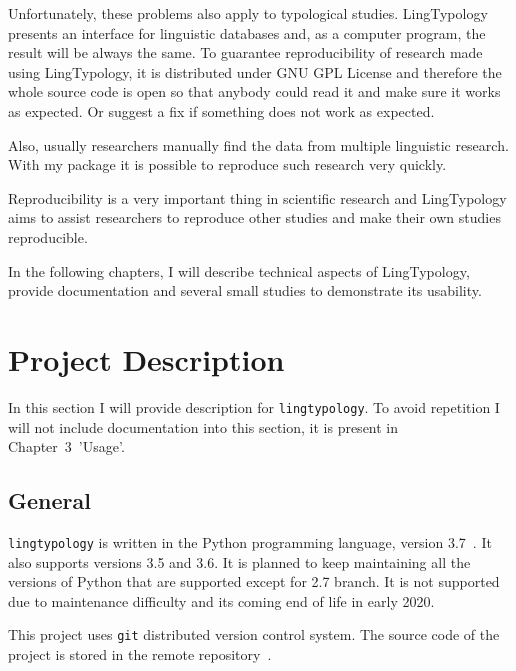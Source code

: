 \documentclass[a4paper,12pt]{article}
\begin{document}
Unfortunately, these problems also apply to typological studies. LingTypology presents an interface for linguistic databases and, as a computer program, the result will be always the same. To guarantee reproducibility of research made using LingTypology, it is distributed under GNU GPL License and therefore the whole source code is open so that anybody could read it and make sure it works as expected. Or suggest a fix if something does not work as expected.

Also, usually researchers manually find the data from multiple linguistic research. With my package it is possible to reproduce such research very quickly.

Reproducibility is a very important thing in scientific research and LingTypology aims to assist researchers to reproduce other studies and make their own studies reproducible.

In the following chapters, I will describe technical aspects of LingTypology, provide documentation and several small studies to demonstrate its usability.

\newpage


\section{Project Description}
In this section I will provide description for \texttt{lingtypology}. To avoid repetition I will not include documentation into this section, it is present in Chapter~3~'Usage'.

\subsection{General}
\texttt{lingtypology} is written in the Python programming language, version 3.7~\parencite{python}. It also supports versions 3.5 and 3.6. It is planned to keep maintaining all the versions of Python that are supported except for 2.7 branch. It is not supported due to maintenance difficulty and its coming end of life in early 2020.

This project uses \texttt{git} distributed version control system. The source code of the project is stored in the remote repository~\parencite{MichaelVoronov2019}.
\end{document}
